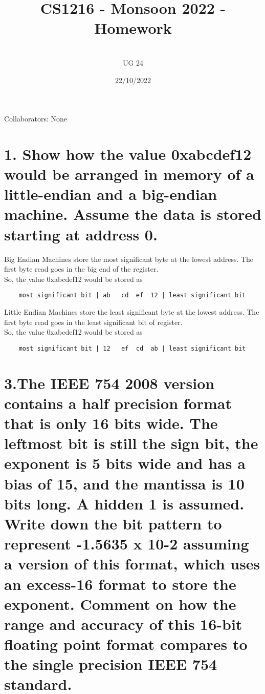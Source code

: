 \documentclass[11pt]{article}
\title{CS1216 - Monsoon 2022 - Homework \Homework}
\author{\Name 
\\UG 24 \SID
}
\date{22/10/2022}
\begin{document}
\maketitle

Collaborators: None

\section*{1. Show how the value 0xabcdef12 would be arranged in memory of a little-endian and a big-endian machine. Assume the data is stored starting at address 0.}

Big Endian Machines store the most significant byte at the lowest address. The first byte read goes in the big end of the register.
\\ So, the value 0xabcdef12 would be stored as

\begin{verbatim}
    most significant bit | ab   cd  ef  12 | least significant bit
\end{verbatim}

Little Endian Machines store the least significant byte at the lowest address. The first byte read goes in the least significant bit of register.
\\ So, the value 0xabcdef12 would be stored as

\begin{verbatim}
    most significant bit | 12   ef  cd  ab | least significant bit
\end{verbatim}

\newpage

\section*{3.The IEEE 754 2008 version contains a half precision format that is only 16 bits wide. The leftmost bit is still the sign bit, the exponent is 5 bits wide and has a bias of 15, and the mantissa is 10 bits long. A hidden 1 is assumed. Write down the bit pattern to represent -1.5635 x 10-2 assuming a version of this format, which uses an excess-16 format to store the exponent. Comment on how the range and accuracy of this 16-bit floating point format compares to the single precision IEEE 754 standard.}



\end{document}
